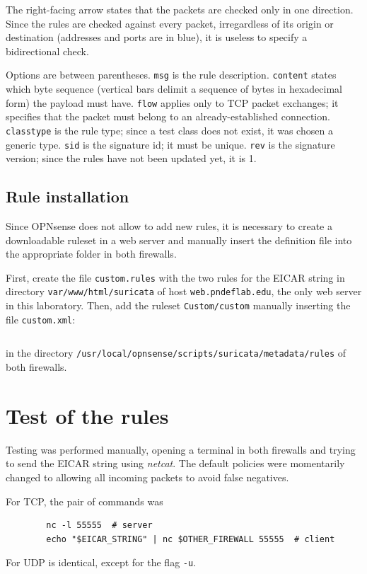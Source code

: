 \documentclass[draft]{homework}
\newcommand{\opn}{OPNsense\xspace}
\begin{document}
    The right-facing arrow states that the packets are checked only in one direction.
    Since the rules are checked against every packet, irregardless of its origin or destination (addresses and ports are in blue), it is useless to specify a bidirectional check.
    
    Options are between parentheses.
    \texttt{msg} is the rule description.
    \texttt{content} states which byte sequence (vertical bars delimit a sequence of bytes in hexadecimal form) the payload must have.
    \texttt{flow} applies only to TCP packet exchanges; it specifies that the packet must belong to an already-established connection.
    \texttt{classtype} is the rule type; since a test class does not exist, it was chosen a generic type.
    \texttt{sid} is the signature id; it must be unique.
    \texttt{rev} is the signature version; since the rules have not been updated yet, it is 1.
    
    \subsection{Rule installation}
    Since \opn does not allow to add new rules, it is necessary to create a downloadable ruleset in a web server and manually insert the definition file into the appropriate folder in both firewalls.
    
    First, create the file \texttt{custom.rules} with the two rules for the EICAR string in directory \texttt{var/www/html/suricata} of host \texttt{web.pndeflab.edu}, the only web server in this laboratory.
    Then, add the ruleset \texttt{Custom/custom} manually inserting the file \texttt{custom.xml}:
    \inputminted{xml}{files/custom.xml}
    \noindent in the directory \texttt{/usr/local/opnsense/scripts/suricata/metadata/rules} of both firewalls.
    
    
    \section{Test of the rules}
    Testing was performed manually, opening a terminal in both firewalls and trying to send the EICAR string using \textit{netcat}.
    The default policies were momentarily changed to allowing all incoming packets to avoid false negatives.
    
    For TCP, the pair of commands was
    \begin{verbatim}
        nc -l 55555  # server
        echo "$EICAR_STRING" | nc $OTHER_FIREWALL 55555  # client
    \end{verbatim}
    For UDP is identical, except for the flag \texttt{-u}.
    
\end{document}
